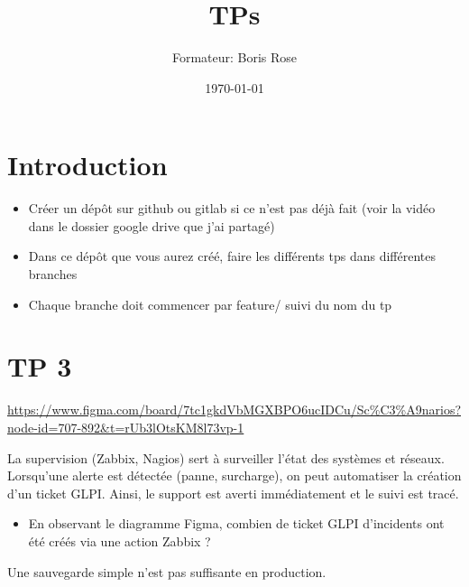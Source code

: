 \documentclass[12pt, letterpaper]{article}
\title{TPs}
\author{Formateur: Boris Rose}
\date{\today}
\begin{document}
\maketitle

\section*{Introduction}

\begin{tcolorbox}[colback=brown!5,colframe=brown!60!black,title=Consignes]

\begin{itemize}
    \item Créer un dépôt sur github ou gitlab si ce n'est pas déjà fait (voir la vidéo dans le dossier google drive que j'ai partagé)
    \item Dans ce dépôt que vous aurez créé, faire les différents tps dans différentes branches
    \item Chaque branche doit commencer par feature/ suivi du nom du tp 
\end{itemize}


\end{tcolorbox}


\section*{TP 3}


\begin{tcolorbox}[colback=cyan!5,colframe=cyan!60!black,title=Figma du Cours]
    \url{https://www.figma.com/board/7tc1gkdVbMGXBPO6ucIDCu/Sc%C3%A9narios?node-id=707-892&t=rUb3lOtsKM8l73vp-1}
\end{tcolorbox}


\begin{tcolorbox}[colback=brown!5,colframe=brown!60!black,title=Supervision]
    La supervision (Zabbix, Nagios) sert à surveiller l’état des systèmes et réseaux. Lorsqu’une alerte est détectée (panne, surcharge), on peut automatiser la création d’un ticket GLPI. Ainsi, le support est averti immédiatement et le suivi est tracé.
\end{tcolorbox}

\begin{itemize}
    \item En observant le diagramme Figma, combien de ticket GLPI d'incidents ont été créés via une action Zabbix ?
\end{itemize}

\begin{tcolorbox}[colback=brown!5,colframe=brown!60!black,title=Sauvegarde]
Une sauvegarde simple n’est pas suffisante en production. 
\end{tcolorbox}
\end{document}
